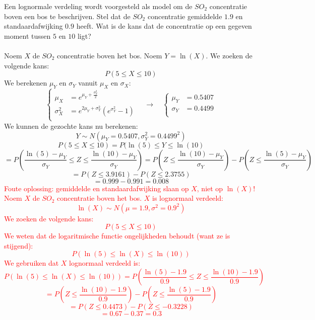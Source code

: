 \documentclass[main.tex]{subfiles}
\begin{document}
\begin{oef}
  Een lognormale verdeling wordt voorgesteld als model om de $SO_{2}$ concentratie boven een bos te beschrijven.
  Stel dat de $SO_{2}$ concentratie gemiddelde $1.9$ en standaardafwijking $0.9$ heeft.
  Wat is de kans dat de concentratie op een gegeven moment tussen $5$ en $10$ ligt?\\\\
  Noem $X$ de $SO_{2}$ concentratie boven het bos.
  Noem $Y=\ln(X)$.
  We zoeken de volgende kans:
  \[ P( 5 \le X \le 10) \]
  We berekenen $\mu_{Y}$ en $\sigma_{Y}$ vanuit $\mu_{X}$ en $\sigma_{X}$:\\
  \[
  \left\{
    \begin{array}{rl}
      \mu_{X} &= e^{\mu_{Y} + \frac{\sigma_{Y}^{2}}{2}}\\
      \sigma_{X}^{2} &= e^{2\mu_{Y} + \sigma_{Y}^{2}}\left(e^{\sigma_{Y}^{2}}-1\right)\\
    \end{array}
  \right.
  \quad\longrightarrow\quad
  \left\{
    \begin{array}{rl}
      \mu_{Y} &= 0.5407\\
      \sigma_{Y} &= 0.4499\\
    \end{array}
  \right.
  \]
  We kunnen de gezochte kans nu berekenen:
  \[ Y \sim N(\mu_{Y}=0.5407,\sigma_{Y}^{2}=0.4499^{2}) \]
  \[ P( 5 \le X \le 10) = P(\ln(5) \le Y \le \ln(10) \]
  \[ = P\left( \frac{\ln(5)-\mu_{Y}}{\sigma_{Y}}  \le Z \le \frac{\ln(10)-\mu_{Y}}{\sigma_{Y}}\right) = P\left( Z \le \frac{\ln(10)-\mu_{Y}}{\sigma_{Y}}\right) - P\left(Z \le \frac{\ln(5)-\mu_{Y}}{\sigma_{Y}}\right) \]
  \[ = P( Z \le 3.9161) - P(Z \le 2.3755) \]
  \[ = 0.999 - 0.991 = 0.008 \]
  \textcolor{red}{Foute oplossing: gemiddelde en standaardafwijking slaan op $X$, niet op $\ln(X)$!\\
  Noem $X$ de $SO_{2}$ concentratie boven het bos.
  $X$ is lognormaal verdeeld:
  \[ \ln(X) \sim N(\mu=1.9,\sigma^{2}=0.9^{2}) \]
  We zoeken de volgende kans:
  \[ P( 5 \le X \le 10) \]
  We weten dat de logaritmische functie ongelijkheden behoudt (want ze is stijgend):
  \[ P\left( \ln(5) \le \ln(X) \le \ln(10)\right) \]
  We gebruiken dat $X$ lognormaal verdeeld is:
  \[ P\left( \ln(5) \le \ln(X) \le \ln(10)\right) = P\left( \frac{\ln(5) - 1.9}{0.9} \le Z \le \frac{\ln(10) - 1.9}{0.9} \right)\]
  \[ 
  = P\left(Z \le \frac{\ln(10) - 1.9}{0.9}\right) - P\left( Z \le \frac{\ln(5) - 1.9}{0.9} \right)
  \]
  \[ 
  = P\left(Z \le 0.4473 \right) - P\left( Z \le -0.3228 \right)
  \]
  \[ 
  = 0.67 - 0.37 = 0.3
  \]
  }
\end{oef}
\end{document}
